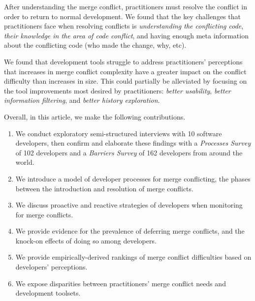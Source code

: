 After understanding the merge conflict, practitioners must resolve the conflict in order to return to normal development.
We found that the key challenges that practitioners face when resolving conflicts is \textit{understanding the conflicting code}, \textit{their knowledge in the area of code conflict}, and having enough meta information about the conflicting code (who made the change, why, etc).

We found that development tools struggle to address practitioners' perceptions that increases in merge conflict complexity have a greater impact on the conflict difficulty  than increases in size.
This could partially be alleviated by focusing on the tool improvements most desired by practitioners: \textit{better usability}, \textit{better information filtering}, and \textit{better history exploration}.


Overall, in this article, we make the following contributions.
\begin{enumerate}
\item We conduct exploratory semi-structured interviews with 10 software developers, then confirm and elaborate these findings with a \textit{Processes Survey} of 102 developers and a \textit{Barriers Survey} of 162 developers from around the world.
\item We introduce a model of developer processes for merge conflicting, the phases between the introduction and resolution of merge conflicts.
\item We discuss proactive and reactive strategies of developers when monitoring for merge conflicts.
\item We provide evidence for the prevalence of deferring merge conflicts, and the knock-on effects of doing so among developers.
\item We provide empirically-derived rankings of merge conflict difficulties based on developers' perceptions.
\item We expose disparities between practitioners' merge conflict needs and development toolsets.
\end{enumerate}